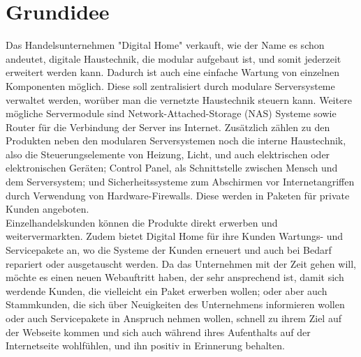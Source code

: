 \section{Grundidee}

Das Handelsunternehmen "Digital Home" verkauft, wie der Name es schon andeutet, digitale Haustechnik, die modular aufgebaut ist, und somit jederzeit erweitert werden kann. Dadurch ist auch eine einfache Wartung von einzelnen Komponenten möglich. Diese soll zentralisiert durch modulare Serversysteme verwaltet werden, worüber man die vernetzte Haustechnik steuern kann. Weitere mögliche Servermodule sind Network-Attached-Storage (NAS) Systeme sowie Router für die Verbindung der Server ins Internet. Zusätzlich zählen zu den Produkten neben den modularen Serversystemen noch die interne Haustechnik, also die Steuerungselemente von Heizung, Licht, und auch elektrischen oder elektronischen Geräten; Control Panel, als Schnittstelle zwischen Mensch und dem Serversystem; und Sicherheitssysteme zum Abschirmen vor Internetangriffen durch Verwendung von Hardware-Firewalls. Diese werden in Paketen für private Kunden angeboten.  
\\
Einzelhandelskunden können die Produkte direkt erwerben und weitervermarkten. Zudem bietet Digital Home für ihre Kunden Wartungs- und Servicepakete an, wo die Systeme der Kunden erneuert und auch bei Bedarf repariert oder ausgetauscht werden.
\newline
\newline
Da das Unternehmen mit der Zeit gehen will, möchte es einen neuen Webauftritt haben, der sehr ansprechend ist, damit sich werdende Kunden, die vielleicht ein Paket erwerben wollen; oder aber auch Stammkunden, die sich über Neuigkeiten des Unternehmens informieren wollen oder auch Servicepakete in Anspruch nehmen wollen, schnell zu ihrem Ziel auf der Webseite kommen und sich auch während ihres Aufenthalts auf der Internetseite wohlfühlen, und ihn positiv in Erinnerung behalten.
